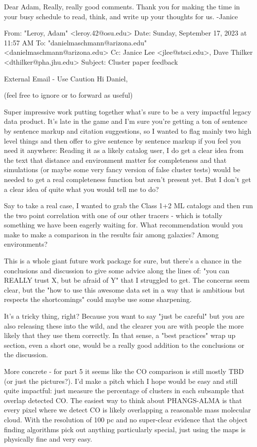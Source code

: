 Dear Adam,  Really, really good comments.  Thank you for making the time in your busy schedule to read, think, and write up your thoughts for us.  -Janice
 
From: "Leroy, Adam" <leroy.42@osu.edu>
Date: Sunday, September 17, 2023 at 11:57 AM
To: "danielmaschmann@arizona.edu" <danielmaschmann@arizona.edu>
Cc: Janice Lee <jlee@stsci.edu>, Dave Thilker <dthilker@pha.jhu.edu>
Subject: Cluster paper feedback
 
External Email - Use Caution
Hi Daniel,
 
(feel free to ignore or to forward as useful)
 
Super impressive work putting together what's sure to be a very impactful legacy data product. It's late in the game and I'm sure you're getting a ton of sentence by sentence markup and citation suggestions, so I wanted to flag mainly two high level things and then offer to give sentence by sentence markup if you feel you need it anywhere:
Reading it as a likely catalog user, I do get a clear idea from the text that distance and environment matter for completeness and that simulations (or maybe some very fancy version of false cluster tests) would be needed to get a real completeness function but aren't present yet. But I don't get a clear idea of quite what you would tell me to do?

Say to take a real case, I wanted to grab the Class 1+2 ML catalogs and then run the two point correlation with one of our other tracers - which is totally something we have been eagerly waiting for. What recommendation would you make to make a comparison in the results fair among galaxies? Among environments?

This is a whole giant future work package for sure, but there's a chance in the conclusions and discussion to give some advice along the lines of: "you can REALLY trust X, but be afraid of Y" that I struggled to get. The concerns seem clear, but the "how to use this awesome data set in a way that is ambitious but respects the shortcomings" could maybe use some sharpening.

It's a tricky thing, right? Because you want to say "just be careful" but you are also releasing these into the wild, and the clearer you are with people the more likely that they use them correctly. In that sense, a "best practices" wrap up section, even a short one, would be a really good addition to the conclusions or the discussion.

 

More concrete - for part 5 it seems like the CO comparison is still mostly TBD (or just the pictures?). I'd make a pitch which I hope would be easy and still quite impactful: just measure the percentage of clusters in each subsample that overlap detected CO. The easiest way to think about PHANGS-ALMA is that every pixel where we detect CO is likely overlapping a reasonable mass molecular cloud. With the resolution of 100 pc and no super-clear evidence that the object finding algorithms pick out anything particularly special, just using the maps is physically fine and very easy.

